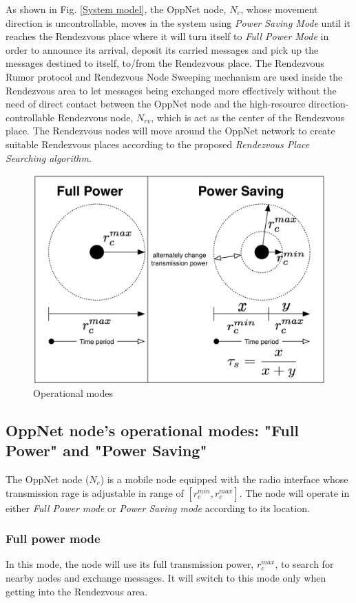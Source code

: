 As shown in Fig. \ref{System model}, the OppNet node, $N_{c}$, whose movement direction is uncontrollable, moves in the system using \textit{Power Saving Mode}  until it reaches the Rendezvous place where it will turn itself to \emph{Full Power Mode} in order to announce its arrival, deposit its carried messages and pick up the messages destined to itself, to/from the Rendezvous place.
The Rendezvous Rumor protocol and Rendezvous Node Sweeping mechanism are used inside the Rendezvous area to let messages being exchanged more effectively without the need of direct contact between the OppNet node and the high-resource direction-controllable Rendezvous node, $N_{rv}$, which is act as the center of the Rendezvous place.
The Rendezvous nodes will move around the OppNet network to create suitable Rendezvous places according to the proposed \emph{Rendezvous Place Searching algorithm}.

\begin{figure}[!t]
	\centering
	\includegraphics[width=5in]{Figures/OperationalMode.pdf}
	\caption{Operational modes}
	\label{Operational modes}
\end{figure}

\subsection{OppNet node's operational modes: "Full Power" and "Power Saving"}
The OppNet node ($N_{c}$) is a mobile node equipped with the radio interface whose transmission rage is adjustable in range of $[{ r }_{ c }^{ min },{ r }_{ c }^{ max }]$.
The node will operate in either \emph{Full Power mode} or \emph{Power Saving mode} according to its location.
\subsubsection{Full power mode}
In this mode, the node will use its full transmission power, ${ r }_{ c }^{ max }$, to search for nearby nodes and exchange messages.
It will switch to this mode only when getting into the Rendezvous area.

